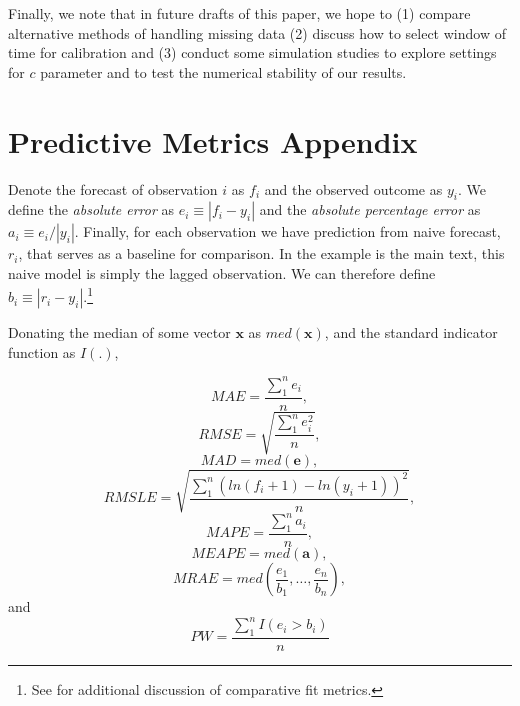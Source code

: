 \documentclass[12pt,fullpage,endnotes]{article}
\begin{document}

Finally, we note that in future drafts of this paper, we hope to (1)
compare alternative methods of handling missing data (2) discuss how
to select window of time for calibration and (3) conduct some
simulation studies to explore settings for $c$ parameter and to test
the numerical stability of our results.




 \newpage
 \appendix


 \section*{Predictive Metrics Appendix}

 Denote the forecast of observation $i$ as $f_i$ and the observed
 outcome as $y_i$.  We define the \textit{absolute error} as
 $e_i\equiv |f_i - y_i|$ and the \textit{absolute percentage error} as
 $a_i \equiv e_i / |y_i|$.  Finally, for each observation we have
 prediction from naive forecast, $r_i$, that serves as a baseline for
 comparison.  In the example is the main text, this naive model is
 simply the lagged observation.  We can therefore define $b_i \equiv
 |r_i - y_i|$.\footnote{See \citet{brandt:freeman:schrodt:2011} for
   additional discussion of comparative fit metrics.}

 Donating the median of some vector $\mathbf{x}$ as $med(\mathbf{x})$,
 and the standard indicator function as $I(.)$,

$$ MAE =\frac{\sum_1^n{e_i}}{n},$$
$$  RMSE = \sqrt{\frac{\sum_1^n{e^2_i}}{n}}, $$
$$  MAD =med(\mathbf{e}), $$
$$  RMSLE = \sqrt{\frac{\sum_1^n\left(ln(f_i+1) - ln(y_i+1)  \right)^2}{n}}, $$
$$  MAPE = \frac{\sum_1^n{a_i}}{n}, $$
$$   MEAPE = med(\mathbf{a}), $$
$$ MRAE = med\left(\frac{e_1}{b_1}, \ldots, \frac{e_n}{b_n} \right),   $$ and
$$ PW  = \frac{\sum_1^nI(e_i > b_i)}{n}$$




\singlespacing


\end{document}
